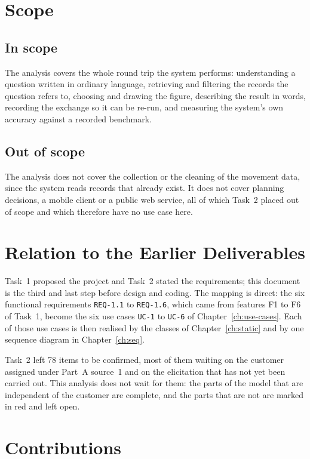 \documentclass[12pt,a4paper]{report}
\begin{document}
\section{Scope}
\label{sec:scope}

\subsection{In scope}
The analysis covers the whole round trip the system performs: understanding
a question written in ordinary language, retrieving and filtering the
records the question refers to, choosing and drawing the figure, describing
the result in words, recording the exchange so it can be re-run, and
measuring the system's own accuracy against a recorded benchmark.

\subsection{Out of scope}
The analysis does not cover the collection or the cleaning of the movement
data, since the system reads records that already exist. It does not cover
planning decisions, a mobile client or a public web service, all of which
Task~2 placed out of scope and which therefore have no use case here.

\section{Relation to the Earlier Deliverables}
\label{sec:relation}

Task~1 proposed the project and Task~2 stated the requirements; this
document is the third and last step before design and coding. The mapping
is direct: the six functional requirements \texttt{REQ-1.1} to
\texttt{REQ-1.6}, which came from features F1 to F6 of Task~1, become the
six use cases \texttt{UC-1} to \texttt{UC-6} of Chapter~\ref{ch:use-cases}.
Each of those use cases is then realised by the classes of
Chapter~\ref{ch:static} and by one sequence diagram in
Chapter~\ref{ch:seq}.

Task~2 left 78 items to be confirmed, most of them waiting on the customer
assigned under Part~A source~1 and on the elicitation that has not yet been
carried out. This analysis does not wait for them: the parts of the model
that are independent of the customer are complete, and the parts that are
not are marked in red and left open.

\section{Contributions}
\label{sec:contributions}
\end{document}
